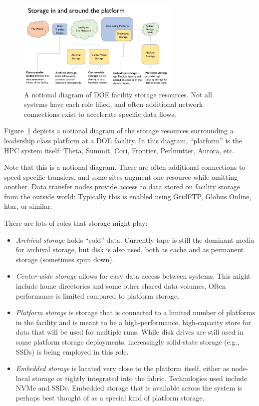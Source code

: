 \begin{figure}[htb!]
	\centering
	\includegraphics[width=0.70\textwidth]{projects/2.3.4-DataViz/DataViz-storage-notional-diagram.pdf}
	\caption{\label{fig:DataViz:StorageDiagram} A notional diagram of DOE
		facility storage resources. Not all systems have each role filled,
		and often additional network connections exist to accelerate specific
		data flows.}
\end{figure}


Figure~\ref{fig:DataViz:StorageDiagram} depicts a notional diagram of
the storage resources surrounding a leadership class platform at a DOE
facility. In this diagram, ``platform'' is the HPC system itself: Theta, Summit,
Cori, Frontier, Perlmutter, Aurora, etc. 

Note that this is a notional diagram. There are often additional
connections to speed specific transfers, and some sites augment one resource
while omitting another.
%
Data transfer nodes provide access to data stored on facility storage from the
outside world: Typically this is enabled using GridFTP, Globus Online, htar, or
similar.

There are lots of roles that storage might play:
\begin{itemize}
	\item \emph{Archival storage} holds ``cold'' data. Currently tape is
	still the dominant media for archival storage, but disk is also used,
	both as cache and as permanent storage (sometimes spun down).
	\item \emph{Center-wide storage} allows for easy data access between
	systems. This might include home directories and some other shared data
	volumes. Often performance is limited compared to platform storage.
	\item \emph{Platform storage} is storage that is connected to a limited
	number of platforms in the facility and is meant to be a high-performance,
	high-capacity store for data that will be used for multiple runs. While
	disk drives are still used in some platform storage deployments,
	increasingly solid-state storage (e.g., SSDs) is being employed in
	this role.
	\item \emph{Embedded storage} is located very close to the platform
	itself, either as node-local storage or tightly integrated into the
	fabric. Technologies used include NVMe and SSDs. Embedded storage that
	is available across the system is perhaps best thought of as a special 
	kind of platform storage.
\end{itemize}

